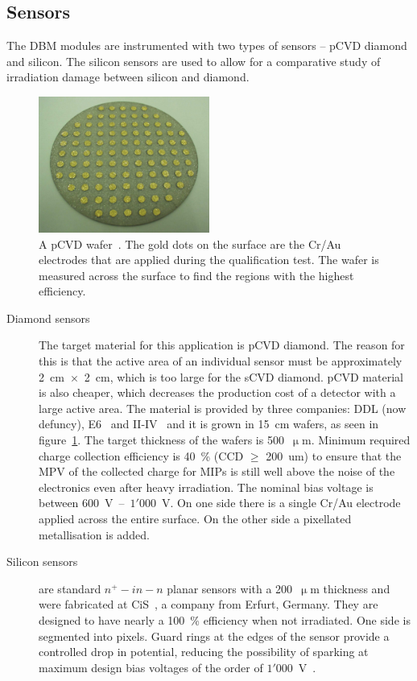 \subsection{Sensors}
The DBM modules are instrumented with two types of sensors -- pCVD diamond and silicon. The silicon sensors are used to allow for a comparative study of irradiation damage between silicon and diamond.
\begin{figure}[!t]
\centering
\includegraphics[width=0.5\textwidth]{04_charge_monitoring/pics/wafer}
\caption{A pCVD wafer~\cite{RADSEN:00001}. The gold dots on the surface are the Cr/Au electrodes that are applied during the qualification test. The wafer is measured across the surface to find the regions with the highest efficiency.}
\label{fig:wafer}
\end{figure}

\begin{description}
\item[Diamond sensors] The target material for this application is pCVD diamond. The reason for this is that the active area of an individual sensor must be approximately 2~cm~$\times$~2~cm, which is too large for the sCVD diamond. pCVD material is also cheaper, which decreases the production cost of a detector with a large active area. The material is provided by three companies: DDL (now defuncy), E6~\cite{E6:00000} and II-IV~\cite{II-IV:00000} and it is grown in 15~cm wafers, as seen in figure~\ref{fig:wafer}. The target thickness of the wafers is 500~$\upmu$m. Minimum required charge collection efficiency is 40~\% (CCD $\geq$ 200~um) to ensure that the MPV of the collected charge for MIPs is still well above the noise of the electronics even after heavy irradiation. The nominal bias voltage is between 600~V~--~$1'000$~V. On one side there is a single Cr/Au electrode applied across the entire surface. On the other side a pixellated metallisation is added. 
\item[Silicon sensors] are standard $n^+ - in - n$ planar sensors with a 200~$\upmu$m thickness and were fabricated at CiS~\cite{CIS:00000}, a company from Erfurt, Germany. They are designed to have nearly a 100~\% efficiency when not irradiated. 
One side is segmented into pixels. Guard rings at the edges of the sensor provide a controlled drop in potential, reducing the possibility of sparking at maximum design bias voltages of the order of $1'000$~V~\cite{ATLIBL:00001,Dopke:1560823}.
\end{description}



